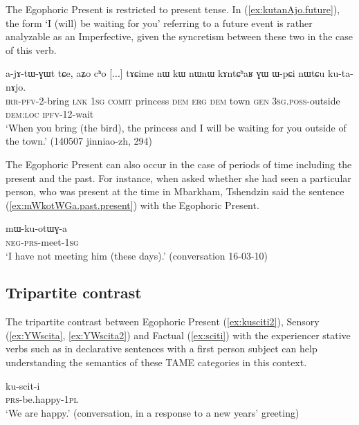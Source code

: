 The Egophoric Present is restricted to present tense. In (\ref{ex:kutanAjo.future}), the form  `I (will) be waiting for you' referring to a future event is rather analyzable as an Imperfective, given the syncretism between these two in the case of this verb.

\begin{exe}
\ex \label{ex:kutanAjo.future}
\gll a-jɤ-tɯ-ɣɯt tɕe, aʑo cʰo [...] tɤɕime nɯ kɯ nɯnɯ kɤntɕʰaʁ ɣɯ ɯ-pɕi nɯtɕu ku-ta-nɤjo. \\
\textsc{irr}-\textsc{pfv}-2-bring \textsc{lnk} \textsc{1sg} \textsc{comit} { } princess \textsc{dem} \textsc{erg} \textsc{dem} town \textsc{gen} \textsc{3sg}.\textsc{poss}-outside \textsc{dem}:\textsc{loc} \textsc{ipfv}-1\fl{}2-wait \\
\glt `When you bring (the bird), the princess and I will be waiting for you outside of the town.' (140507 jinniao-zh, 294)
\end{exe}

The Egophoric Present can also occur in the case of periods of time including the present and the past. For instance, when asked whether she had seen a particular person, who was present at the time in Mbarkham, Tshendzin said the sentence (\ref{ex:mWkotWGa.past.present}) with the Egophoric Present.

\begin{exe}
\ex \label{ex:mWkotWGa.past.present}
\gll mɯ-ku-otɯɣ-a \\
\textsc{neg}-\textsc{prs}-meet-\textsc{1sg} \\
\glt `I have not meeting him (these days).' (conversation 16-03-10)
\end{exe} 

 \subsection{Tripartite contrast} \label{sec:egophoric.tripartite}
The tripartite contrast between Egophoric Present (\ref{ex:kusciti2}), Sensory (\ref{ex:YWscita}, \ref{ex:YWscita2}) and Factual (\ref{ex:sciti}) with the experiencer stative verbs such as  in  declarative sentences with a first person subject can help understanding the semantics of these TAME categories in this context.


\begin{exe}
\ex \label{ex:kusciti2}
\gll ku-scit-i \\
\textsc{prs}-be.happy-\textsc{1pl} \\
\glt `We are happy.' (conversation, in a response to a new years' greeting)
\end{exe}

